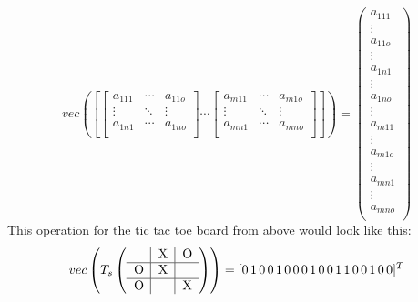 \documentclass[12pt]{article}
\newcommand{\ticTacToe}[9]{
\begin{tabular}{p{7px}|p{7px}|p{7px}}
  #1 & #2 & #3 \\      \hline
  #4 & #5 & #6 \\      \hline
  #7 & #8 & #9 \\
\end{tabular}
}
\begin{document}
\begin{equation}
vec
\left(\left[ 
\begin{bmatrix}
a_{111} & \cdots & a_{11o} \\
\vdots & \ddots & \vdots \\
a_{1n1} & \cdots & a_{1no} \\
\end{bmatrix}
\cdots
\begin{bmatrix}
a_{m11} & \cdots &  a_{m1o} \\
\vdots   & \ddots & \vdots   \\
a_{mn1} & \cdots & a_{mno}  \\
\end{bmatrix}
\right]\right) = \left(\begin{matrix}
a_{111}      \\
\vdots        \\
a_{11o}      \\
\vdots        \\
a_{1n1}      \\
\vdots        \\
a_{1no}      \\
\vdots        \\
a_{m11}     \\
\vdots        \\
a_{m1o}     \\
\vdots        \\
 a_{mn1}    \\
\vdots        \\
 a_{mno}    \\
\end{matrix}\right)
\end{equation}
This operation for the tic tac toe board from above would look like this:
\begin{equation}
vec\left(T_s\left(\ticTacToe{}{X}{O}{O}{X}{}{O}{}{X}\right)\right) = 
[0\,1\,0\,0\,1\,0\,0\,0\,1\,0 \,0 \,1\,1\,0\,0\,1\,0\,0]^T
\end{equation}
\end{document}
